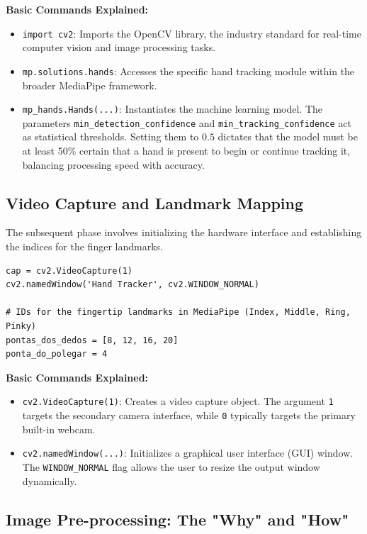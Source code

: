 \textbf{Basic Commands Explained:}
\begin{itemize}
    \item \texttt{import cv2}: Imports the OpenCV library, the industry standard for real-time computer vision and image processing tasks.
    \item \texttt{mp.solutions.hands}: Accesses the specific hand tracking module within the broader MediaPipe framework.
    \item \texttt{mp\_hands.Hands(...)}: Instantiates the machine learning model. The parameters \texttt{min\_detection\_confidence} and \texttt{min\_tracking\_confidence} act as statistical thresholds. Setting them to $0.5$ dictates that the model must be at least 50\% certain that a hand is present to begin or continue tracking it, balancing processing speed with accuracy.
\end{itemize}

\subsection{Video Capture and Landmark Mapping}
\label{subsec:capture}

The subsequent phase involves initializing the hardware interface and establishing the indices for the finger landmarks.

\begin{lstlisting}
cap = cv2.VideoCapture(1)
cv2.namedWindow('Hand Tracker', cv2.WINDOW_NORMAL)

# IDs for the fingertip landmarks in MediaPipe (Index, Middle, Ring, Pinky)
pontas_dos_dedos = [8, 12, 16, 20]
ponta_do_polegar = 4
\end{lstlisting}

\textbf{Basic Commands Explained:}
\begin{itemize}
    \item \texttt{cv2.VideoCapture(1)}: Creates a video capture object. The argument \texttt{1} targets the secondary camera interface, while \texttt{0} typically targets the primary built-in webcam.
    \item \texttt{cv2.namedWindow(...)}: Initializes a graphical user interface (GUI) window. The \texttt{WINDOW\_NORMAL} flag allows the user to resize the output window dynamically.
\end{itemize}

\subsection{Image Pre-processing: The "Why" and "How"}
\label{subsec:preprocessing}

